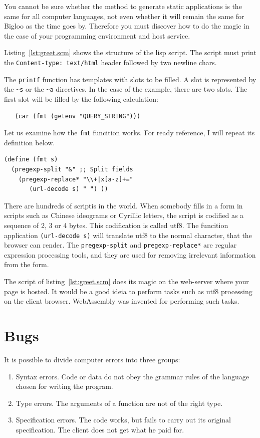 \documentclass[a4paper,12pt]{book}
\begin{document}
You cannot be sure whether the method to generate static
applications is the same for all computer languages, not
even whether it will remain the same for Bigloo as the time
goes by. Therefore you must discover how to do the magic
in the case of your programming environment and host service.



Listing~\ref{lst:greet.scm} shows
the structure of the lisp script.
The script must print the
\verb|Content-type: text/html| header
followed by two newline chars.

The \verb|printf| function has templates with slots to
be filled. A slot is represented by the \verb|~s| or
the \verb|~a| directives. In the case of the example,
there are two slots. The first slot will be filled
by the following calculation:
\begin{verbatim}
   (car (fmt (getenv "QUERY_STRING")))
\end{verbatim}
Let us examine how the \verb|fmt| funcition works.
For ready reference, I will repeat its definition below.
\begin{verbatim}
(define (fmt s)
  (pregexp-split "&" ;; Split fields
    (pregexp-replace* "\\+|x[a-z]+="
       (url-decode s) " ") ))	
\end{verbatim}
There are hundreds of scriptis in the world. When somebody
fills in a form in scripts such as Chinese ideograms or
Cyrillic letters, the script is codified as a sequence of
2, 3 or 4 bytes. This codification is called utf8.
The funcition application \verb|(url-decode s)| will
translate utf8 to the normal character, that the browser
can render. The \verb|pregexp-split| and
\verb|pregexp-replace*| are regular expression processing
tools, and they are used for removing irrelevant
information from the form.

The script of listing~\ref{lst:greet.scm} does its magic
on the web-server where your page is hosted. It would be
a good ideia to perform tasks such as utf8 processing on
the client browser. WebAssembly was invented for performing
such tasks.


\chapter{Bugs}
It is possible to divide computer errors into three groups:
\begin{enumerate}
\item Syntax errors. Code or data
do not obey the grammar rules of the language
chosen for writing the program.
\item Type errors. The arguments of a function
are not of the right type.
\item Specification errors. The code works,
but fails to carry out its original specification.
The client does not get what he paid for.
\end{enumerate}
\end{document}
